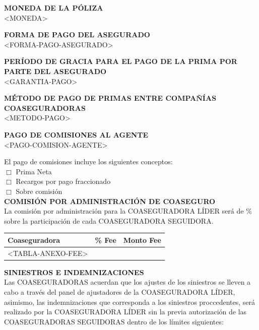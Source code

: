 \documentclass[letterpaper,10pt]{article}
\begin{document}
\textbf{MONEDA DE LA PÓLIZA}\\

<MONEDA>

\textbf{FORMA DE PAGO DEL ASEGURADO}\\

<FORMA-PAGO-ASEGURADO>

\textbf{PERÍODO DE GRACIA PARA EL PAGO DE LA PRIMA POR PARTE DEL ASEGURADO}\\

<GARANTIA-PAGO>

\newpage

\textbf{MÉTODO DE PAGO DE PRIMAS ENTRE COMPAÑÍAS COASEGURADORAS}\\

<METODO-PAGO>

\textbf{PAGO DE COMISIONES AL AGENTE}\\

<PAGO-COMISION-AGENTE>

El pago de comisiones incluye los siguientes conceptos:\\

$\Box$ Prima Neta\\
\indent $\Box$ Recargos por pago fraccionado\\
\indent $\Box$ Sobre comisión\\

\textbf{COMISIÓN POR ADMINISTRACIÓN DE COASEGURO}\\

La comisión por administración para la COASEGURADORA LÍDER será de \underline{\hspace{2cm}}\% sobre la participación de cada COASEGURADORA SEGUIDORA.\\

\begin{center}
    \begin{tabularx}{\textwidth}{|X|c|r|}
        \hline
        \textbf{Coaseguradora} & \textbf{\% Fee} & \textbf{Monto Fee}\\\hline
        <TABLA-ANEXO-FEE>
    \end{tabularx}
\end{center}

\textbf{SINIESTROS E INDEMNIZACIONES}\\

Las COASEGURADORAS acuerdan que los ajustes de los siniestros se lleven a cabo a través del panel de ajustadores de la COASEGURADORA LÍDER, asimismo, las indemnizaciones que corresponda a los siniestros proccedentes, será realizado por la COASEGURADORA LÍDER sin la previa autorización de las COASEGURADORAS SEGUIDORAS dentro de los límites siguientes:\\
\end{document}
